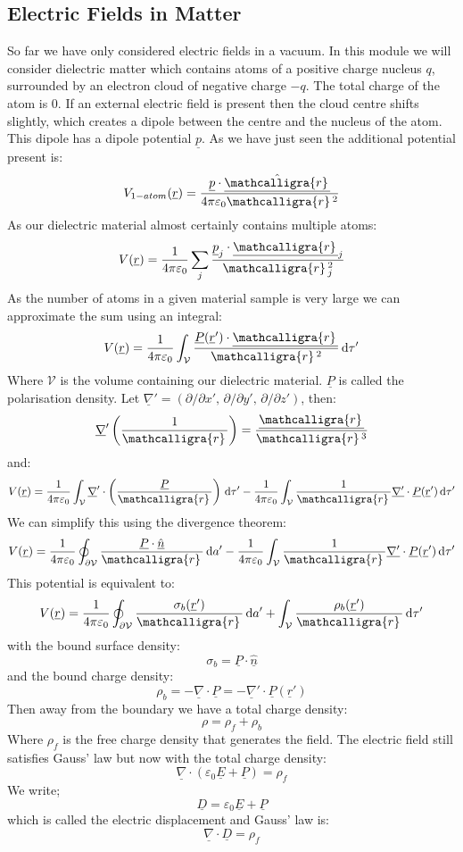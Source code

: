 \documentclass[12pt]{article}
\newcommand{\scriptr}{\ensuremath{\mathcalligra{r}}\,}
\begin{document}
\subsection{Electric Fields in Matter}
So far we have only considered electric fields in a vacuum. In this module we will consider dielectric matter which contains atoms of a positive charge nucleus \(q\), surrounded by an electron cloud of negative charge \(-q\). The total charge of the atom is \(0\). If an external electric field is present then the cloud centre shifts slightly, which creates a dipole between the centre and the nucleus of the atom. This dipole has a dipole potential \(\underline{p}\). As we have just seen the additional potential present is:
\[V_{1-atom}(\underline{r})=\frac{\underline{p}\cdot\underline{\hat{\scriptr}}}{4\pi\varepsilon_0\scriptr^2}\]
As our dielectric material almost certainly contains multiple atoms:
\[V(\underline{r})=\frac{1}{4\pi\varepsilon_0}\sum_j\frac{\underline{p}_j\cdot\underline{\scriptr}_j}{\scriptr^2_j}\]
As the number of atoms in a given material sample is very large we can approximate the sum using an integral:
\[V(\underline{r})=\frac{1}{4\pi\varepsilon_0}\int_\mathcal{V}\frac{\underline{P}(\underline{r}')\cdot\underline{\scriptr}}{\scriptr^2}\,\text{d}\tau'\]
Where \(\mathcal{V}\) is the volume containing our dielectric material. \(\underline{P}\) is called the polarisation density. Let \(\underline{\nabla}'=\left(\partial/\partial x',\, \partial/\partial y',\,\partial/\partial z'\right)\), then:
\[\underline{\nabla}'\left(\frac{1}{\scriptr}\right)=\frac{\underline{\scriptr}}{\scriptr^3}\]
and:
\[V(\underline{r})=\frac{1}{4\pi\varepsilon_0}\int_\mathcal{V}\underline{\nabla}'\cdot\left(\frac{\underline{P}}{\scriptr}\right)\,\text{d}\tau'-\frac{1}{4\pi\varepsilon_0}\int_{\mathcal{V}}\frac{1}{\scriptr}\underline{\nabla'}\cdot\underline{P}(\underline{r}')\,\text{d}\tau'\]
We can simplify this using the divergence theorem:
\[V(\underline{r})=\frac{1}{4\pi\varepsilon_0}\oint_{\partial\mathcal{V}}\frac{\underline{P}\cdot\underline{\hat{n}}}{\scriptr}\,\text{d}a'-\frac{1}{4\pi\varepsilon_0}\int_{\mathcal{V}}\frac{1}{\scriptr}\underline{\nabla'}\cdot\underline{P}(\underline{r}')\,\text{d}\tau'\]
This potential is equivalent to:
\[V(\underline{r})=\frac{1}{4\pi\varepsilon_0}\oint_{\partial\mathcal{V}}\frac{\sigma_b(\underline{r}')}{\scriptr}\,\text{d}a'+\int_\mathcal{V}\frac{\rho_b(\underline{r}')}{\scriptr}\,\text{d}\tau'\]
with the bound surface density:
\[\sigma_b=\underline{P}\cdot\underline{\hat{n}}\]
and the bound charge density:
\[\rho_b=-\underline{\nabla}\cdot\underline{P}=-\underline{\nabla}'\cdot\underline{P}(\underline{r}')\]
Then away from the boundary we have a total charge density:
\[\rho=\rho_f+\rho_b\]
Where \(\rho_f\) is the free charge density that generates the field. The electric field still satisfies Gauss' law but now with the total charge density:
\[\underline{\nabla}\cdot(\varepsilon_0\underline{E}+\underline{P})=\rho_f\]
We write;
\[\underline{D}=\varepsilon_0\underline{E}+\underline{P}\]
which is called the electric displacement and Gauss' law is:
\[\underline{\nabla}\cdot\underline{D}=\rho_f\]
\end{document}
